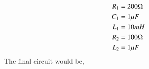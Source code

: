 \begin{enumerate}[label=\thesection.\arabic*.,ref=\thesection.\theenumi]
\begin{align}
R_1&= 200\ohm \\
C_1&= 1\mu F\\
L_1&= 10mH \\
R_2&= 100\ohm \\
L_2&=1 \mu F
\end{align}
The final circuit would be,
\begin{figure}[!ht]
	\begin{center}
		\resizebox{2\columnwidth}{!}{}
	\end{center}
\caption{}
\label{fig:ee18btech11006_6}
\end{figure}
\end{enumerate}
